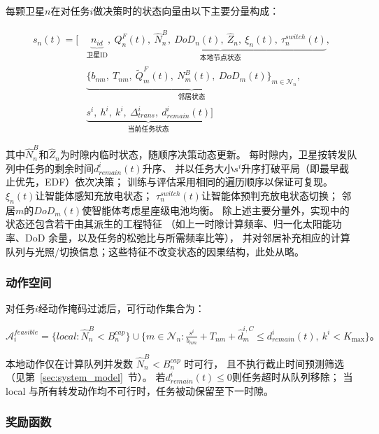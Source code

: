 \documentclass[a4paper,11pt]{article}
\begin{document}
每颗卫星$n$在对任务$i$做决策时的状态向量由以下主要分量构成：

\begin{equation}
\begin{aligned}
s_n(t) = \Big[
&\underbrace{n_{id}}_{\text{卫星ID}},\
\underbrace{Q^F_n(t),\ \hat{N}^B_n,\ DoD_n(t),\
\hat{Z}_n,\ \xi_n(t),\ \tau^{switch}_n(t)}_{\text{本地节点状态}}, \\
&\underbrace{\{b_{nm},\ T_{nm},\ \tilde{Q}^F_m(t),\
N^B_m(t),\ DoD_m(t)\}_{m \in \mathcal{N}_n}}_{\text{邻居状态}}, \\
&\underbrace{s^i,\ h^i,\ k^i,\ \Delta^i_{trans},\
d^i_{remain}(t)}_{\text{当前任务状态}}
\Big]
\end{aligned}
\label{eq:state}
\end{equation}

其中$\hat{N}^B_n$和$\hat{Z}_n$为时隙内临时状态，随顺序决策动态更新。
每时隙内，卫星按转发队列中任务的剩余时间$d^i_{remain}(t)$升序、
并以任务大小$s^i$升序打破平局（即最早截止优先，EDF）依次决策；
训练与评估采用相同的遍历顺序以保证可复现。
$\xi_n(t)$让智能体感知充放电状态；
$\tau^{switch}_n(t)$让智能体预判充放电状态切换；
邻居$m$的$DoD_m(t)$使智能体考虑星座级电池均衡。
除上述主要分量外，实现中的状态还包含若干由其派生的工程特征
（如上一时隙计算频率、归一化太阳能功率、DoD 余量，以及任务的松弛比与所需频率比等），
并对邻居补充相应的计算队列与光照/切换信息；这些特征不改变状态的因果结构，此处从略。

\subsubsection{动作空间}

对任务$i$经动作掩码过滤后，可行动作集合为：

\begin{equation}
\mathcal{A}^{feasible}_i =
\{local : \hat{N}^B_n < B^{cap}_n\}
\cup \Big\{m \in \mathcal{N}_n : \tfrac{s^i}{b_{nm}}+T_{nm}+\hat{d}^{i,C}_m \le d^i_{remain}(t),\ k^i < K_{\max}\Big\}。
\label{eq:feasible_actions}
\end{equation}

本地动作仅在计算队列并发数 $\hat{N}^B_n < B^{cap}_n$ 时可行，
且不执行截止时间预测筛选（见第~\ref{sec:system_model}~节）。
若$d^i_{remain}(t) \leq 0$则任务超时从队列移除；
当 local 与所有转发动作均不可行时，任务被动保留至下一时隙。

\subsubsection{奖励函数}
\label{subsec:reward}
\end{document}
